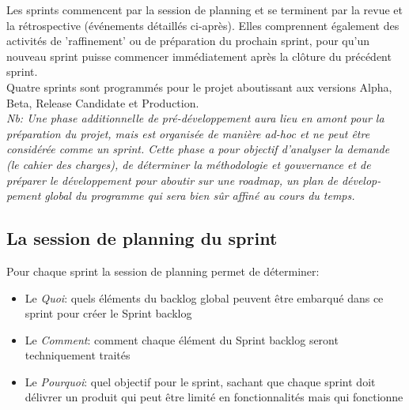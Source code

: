 Les sprints commencent par la session de planning et se terminent par la revue et la rétrospective (événements détaillés ci-après). Elles comprennent également des activités de 'raffinement' ou de préparation du prochain sprint,
 pour qu’un nouveau sprint puisse commencer immédiatement après la clôture du précédent sprint.\\

Quatre sprints sont programmés pour le projet aboutissant aux versions Alpha, Beta, Release Candidate et 
Production.\\

\emph{Nb: Une phase additionnelle de pré-développement aura lieu en amont pour la préparation du projet,
 mais est organisée de manière ad-hoc et ne peut être considérée comme un sprint. 
 Cette phase a pour objectif d’analyser la demande (le cahier des charges), de déterminer la méthodologie
 et gouvernance et de préparer le développement pour aboutir sur une roadmap, un plan de dévelop-pement 
 global du programme qui sera bien sûr affiné au cours du temps.
}

\subsection{La session de planning du sprint}

Pour chaque sprint la session de planning permet de déterminer:

\begin{itemize}
    \item Le \emph{Quoi}: quels éléments du backlog global peuvent être embarqué dans ce sprint pour créer le Sprint backlog
    \item Le \emph{Comment}: comment chaque élément du Sprint backlog seront techniquement traités
    \item Le \emph{Pourquoi}: quel objectif pour le sprint, sachant que chaque sprint doit délivrer un produit qui peut être limité en fonctionnalités mais qui fonctionne
\end{itemize}

